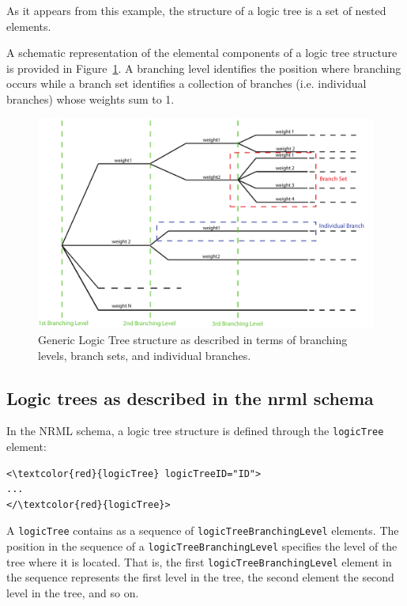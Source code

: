 As it appears from this example, the structure of a logic tree is a set of
nested elements.

A schematic representation of the elemental components of a logic tree
structure is provided in Figure~\ref{glts}. A branching level identifies the
position where branching occurs while  a branch set identifies a collection of
branches (i.e. individual branches)  whose weights sum to 1.

\begin{figure}[!ht]
\centering
\includegraphics[width=15cm]{figures/hazard/GenericLogicTreeStructure.pdf}
\caption{Generic Logic Tree structure as described in terms of branching
levels, branch sets, and individual branches.}
\label{glts}
\end{figure}



\subsection{Logic trees as described in the nrml schema}

In the NRML schema, a logic tree structure is defined through the
\Verb+logicTree+ element:

\begin{Verbatim}[frame=single, commandchars=\\\{\}]
<\textcolor{red}{logicTree} logicTreeID="ID">
...
</\textcolor{red}{logicTree}>
\end{Verbatim}

A \Verb+logicTree+ contains as a sequence of \Verb+logicTreeBranchingLevel+
elements. The position in the sequence of a \Verb+logicTreeBranchingLevel+
specifies the level of the tree where it is located. That is, the first
\texttt{logicTreeBranchingLevel} element in the sequence represents  the first
level in the tree, the second element the second level in the tree, and so on.

